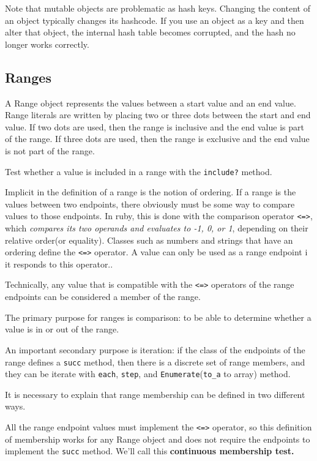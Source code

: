\documentclass[11pt, a4paper]{book}
\begin{document}
Note that mutable objects are problematic as hash keys. Changing the content of
an object typically changes its hashcode. If you use an object as a key and then
alter that object, the internal hash table becomes corrupted, and the hash no
longer works correctly.

\subsection{Ranges}
A Range object represents the values between a start value and an end value.
Range literals are written by placing two or three dots between the start and
end value. If two dots are used, then the range is inclusive and the end value
is part of the range. If three dots are used, then the range is exclusive and
the end value is not part of the range.

Test whether a value is included in a range with the \verb|include?| method.

Implicit in the definition of a range is the notion of ordering. If a range is
the values between two endpoints, there obviously must be some way to compare
values to those endpoints. In ruby, this is done with the comparison operator
\verb|<=>|, which \emph{compares its two operands and evaluates to -1, 0, or 1},
depending on their relative order(or equality). Classes such as numbers and
strings that have an ordering define the \verb|<=>| operator. A value can only
be used as a range endpoint i it responds to this operator..

Technically, any value that is compatible with the \verb|<=>| operators of the
range endpoints can be considered a member of the range.

The primary purpose for ranges is comparison: to be able to determine whether a
value is in or out of the range.

An important secondary purpose is iteration: if the class of the endpoints of
the range defines a \verb|succ| method, then there is a discrete set of range
members, and they can be iterate with \verb|each|, \verb|step|, and
\verb|Enumerate|(\verb|to_a| to array) method.

It is necessary to explain that range membership can be defined in two different
ways.

All the range endpoint values must implement the \verb|<=>| operator, so this definition
of membership works for any Range object and does not require the endpoints to
implement the \verb|succ| method. We'll call this \textbf{continuous membership
test.}
\end{document}
